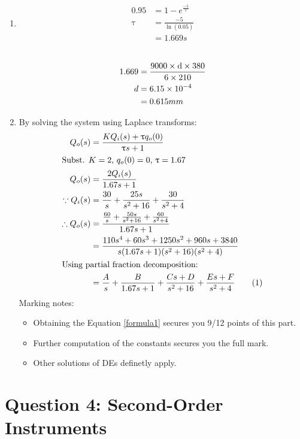 \documentclass[a4paper,11pt,dvipsnames]{book}
\begin{document}
\begin{solution}
\begin{enumerate}
\item  \begin{align*}
0.95 &= 1 - e^{\frac{-5}{\uptau}} \\
\uptau &= \frac{-5}{\ln(0.05)} \\
&= 1.669 s \\
\end{align*} \\
\begin{align*}
1.669 &= \frac{\rm 9000 \times d  \times 380 }{6 \times 210 } \\
d &= 6.15 \times 10^{-4} \\
&= 0.615 mm
\end{align*}
\item By solving the system using Laplace transforms: \\
\begin{align*}
Q_o(s) &= \frac{ K Q_i(s) + \uptau q_o(0) }{ \uptau s + 1} \\
\intertext{Subst. $K=2$, $q_o(0)=0$, $\uptau = 1.67$} 
Q_o(s) &= \frac{ 2Q_i(s) }{ 1.67 s + 1} \\
\because Q_i(s) &= \frac{30}{s} + \frac{25s}{s^2+16} + \frac{30}{s^2+4} \\
\therefore Q_o(s) &= \frac{ \frac{60}{s} + \frac{50s}{s^2+16} + \frac{60}{s^2+4} }{ 1.67 s + 1} \\
&= \frac{110s^4+60s^3+ 1250s^2+960s+3840}{s(1.67s+1)(s^2+16)(s^2+4)} \\
\intertext{Using partial fraction decomposition:}
&= \frac{A}{s} + \frac{B}{1.67s+1} + \frac{Cs+D}{s^2+16} + \frac{Es+F}{s^2+4} \stepcounter{equation}\tag{\theequation}\label{formula1} 
\end{align*}
Marking notes:
\begin{itemize}
\item Obtaining the Equation \eqref{formula1} secures you 9/12 points of this part.
\item Further computation of the constants secures you the full mark.
\item Other solutions of DEs definetly apply. 
\end{itemize}
\end{enumerate}

\end{solution}


\chapter*{Question 4: Second-Order Instruments}
\end{document}
